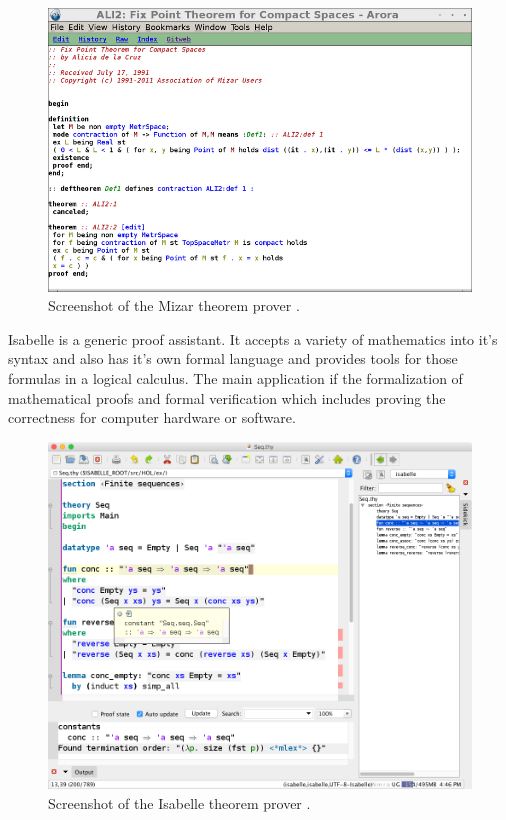 \begin{figure}[H]
\begin{center}
\includegraphics[scale=0.5]{Figures/Background/mizar.png}
\end{center}
\caption{Screenshot of the Mizar theorem prover \cite{mizar}. \label{fig:mizar}}
\end{figure}

Isabelle \cite{isabelle} is a generic proof assistant. It accepts a variety of mathematics into it's syntax and also has it's own formal language and provides tools for those formulas in a logical calculus. The main application if the formalization of mathematical proofs and formal verification which includes proving the correctness for computer hardware or software.

\begin{figure}[H]
\begin{center}
\includegraphics[scale=0.4]{Figures/Background/isabelle.png}
\end{center}
\caption{Screenshot of the Isabelle theorem prover \cite{isabelle}. \label{fig:isabelle}}
\end{figure}

